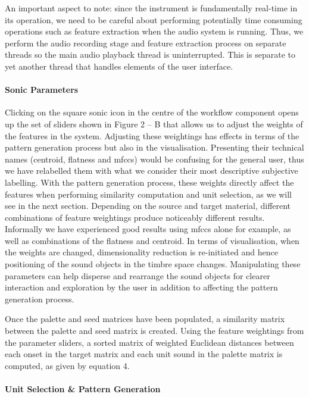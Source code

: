 An important aspect to note: since the instrument is fundamentally real-time in its operation, we need to be careful about performing potentially time consuming operations such as feature extraction when the audio system is running. Thus, we perform the audio recording stage and feature extraction process on separate threads so the main audio playback thread is uninterrupted. This is separate to yet another thread that handles elements of the user interface.

\paragraph{Sonic Parameters}

Clicking on the square sonic icon in the centre of the workflow component opens up the set of sliders shown in Figure 2 – B that allows us to adjust the weights of the features in the system. Adjusting these weightings has effects in terms of the pattern generation process but also in the visualisation. Presenting their technical names (centroid, flatness and \acrshort{mfcc}s) would be confusing for the general user, thus we have relabelled them with what we consider their most descriptive subjective labelling. With the pattern generation process, these weights directly affect the features when performing similarity computation and unit selection, as we will see in the next section. Depending on the source and target material, different combinations of feature weightings produce noticeably different results. Informally we have experienced good results using \acrshort{mfcc}s alone for example, as well as combinations of the flatness and centroid. In terms of visualisation, when the weights are changed, dimensionality reduction is re-initiated and hence positioning of the sound objects in the timbre space changes. Manipulating these parameters can help disperse and rearrange the sound objects for clearer interaction and exploration by the user in addition to affecting the pattern generation process.

Once the palette and seed matrices have been populated, a similarity matrix between the palette and seed matrix is created. Using the feature weightings from the parameter sliders, a sorted matrix of weighted Euclidean distances between each onset in the target matrix and each unit sound in the palette matrix is computed, as given by equation 4.

\paragraph{Unit Selection \& Pattern Generation}

